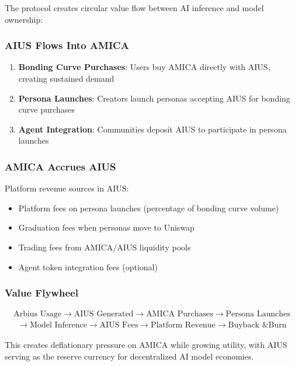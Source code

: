 \documentclass{article}
\begin{document}
The protocol creates circular value flow between AI inference and model ownership:

\subsubsection{AIUS Flows Into AMICA}

\begin{enumerate}
    \item \textbf{Bonding Curve Purchases}: Users buy AMICA directly with AIUS, creating sustained demand
    \item \textbf{Persona Launches}: Creators launch personas accepting AIUS for bonding curve purchases
    \item \textbf{Agent Integration}: Communities deposit AIUS to participate in persona launches
\end{enumerate}

\subsubsection{AMICA Accrues AIUS}

Platform revenue sources in AIUS:
\begin{itemize}
    \item Platform fees on persona launches (percentage of bonding curve volume)
    \item Graduation fees when personas move to Uniswap
    \item Trading fees from AMICA/AIUS liquidity pools
    \item Agent token integration fees (optional)
\end{itemize}

\subsubsection{Value Flywheel}

\begin{align}
\text{Arbius Usage} \rightarrow \text{AIUS Generated} \rightarrow \text{AMICA Purchases} \rightarrow \text{Persona Launches}
\end{align}
\begin{align}
\rightarrow \text{Model Inference} \rightarrow \text{AIUS Fees} \rightarrow \text{Platform Revenue} \rightarrow \text{Buyback \& Burn}
\end{align}

This creates deflationary pressure on AMICA while growing utility, with AIUS serving as the reserve currency for decentralized AI model economies.
\end{document}
